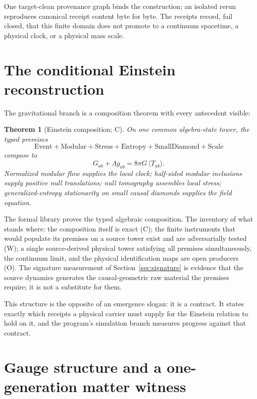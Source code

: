 \documentclass[11pt]{article}
\newtheorem{theorem}{Theorem}[section]
\theoremstyle{remark}
\newcommand{\evW}{\textsf{W}}   %
\newcommand{\evC}{\textsf{C}}   %
\newcommand{\evO}{\textsf{O}}   %
\begin{document}
One target-clean provenance graph binds the construction; an isolated rerun
reproduces canonical receipt content byte for byte. The receipts record,
fail closed, that this finite domain does not promote to a continuum
spacetime, a physical clock, or a physical mass scale.

\section{The conditional Einstein reconstruction}
\label{sec:einstein}

The gravitational branch is a composition theorem with every antecedent
visible:

\begin{theorem}[Einstein composition; \evC]
\label{thm:einstein}
On one common algebra-state tower, the typed premises
\[
\mathrm{Event}+\mathrm{Modular}+\mathrm{Stress}+\mathrm{Entropy}
+\mathrm{SmallDiamond}+\mathrm{Scale}
\]
compose to
\begin{equation}
G_{ab}+\Lambda g_{ab}=8\pi G\,\langle T_{ab}\rangle .
\end{equation}
Normalized modular flow supplies the local clock; half-sided modular
inclusions supply positive null translations; null tomography assembles
local stress; generalized-entropy stationarity on small causal diamonds
supplies the field equation.
\end{theorem}

The formal library proves the typed algebraic composition. The inventory of
what stands where: the composition itself is exact (\evC); the
finite instruments that would populate its premises on a source tower exist
and are adversarially tested (\evW); a single source-derived physical tower
satisfying all premises simultaneously, the continuum limit, and the
physical identification maps are open producers (\evO). The signature
measurement of Section~\ref{sec:signature} is evidence that the source
dynamics generates the causal-geometric raw material the premises require;
it is not a substitute for them.

This structure is the opposite of an emergence slogan: it is a contract. It
states exactly which receipts a physical carrier must supply for the
Einstein relation to hold on it, and the program's simulation branch
measures progress against that contract.

\section{Gauge structure and a one-generation matter witness}
\label{sec:gauge}
\end{document}
